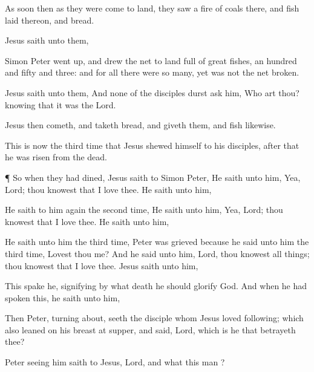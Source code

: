 {As
soon
then as they were
come
to
land, they
saw a fire of
coals
there,
and
fish laid
thereon,
and
bread.

Jesus
saith unto
them,
{}

Simon
Peter went
up,
and
drew the
net
to
land
full of
great
fishes, an
hundred and fifty and
three:
and for all there
were so
many, yet
was
not the
net
broken.

Jesus
saith unto
them,
{}
And
none of the
disciples
durst
ask
him,
Who
art
thou?
knowing
that it
was the
Lord.

Jesus
then
cometh,
and
taketh
bread,
and
giveth
them,
and
fish
likewise.

This is
now the third
time that
Jesus shewed
himself to
his
disciples, after that he was
risen
from the
dead.


\par }{\PP {}¶
So
when they had
dined,
Jesus
saith to
Simon
Peter,
{} He
saith unto
him,
Yea,
Lord;
thou
knowest
that I
love
thee. He
saith unto
him,
{}

He
saith to
him
again the second
time,
{} He
saith unto
him,
Yea,
Lord;
thou
knowest
that I
love
thee. He
saith unto
him,
{}

He
saith unto
him the third
time,
{}
Peter was
grieved
because he
said unto
him the third
time, Lovest
thou
me?
And he
said unto
him,
Lord,
thou
knowest all
things;
thou
knowest
that I
love
thee.
Jesus
saith unto
him,
{}


This spake
he,
signifying by
what
death he should
glorify
God.
And when he had
spoken
this, he
saith unto
him,
{}

Then
Peter, turning
about,
seeth the
disciple
whom
Jesus
loved
following;
which
also
leaned
on
his
breast
at
supper,
and
said,
Lord,
which
is he
that
betrayeth
thee?

Peter
seeing
him
saith to
Jesus,
Lord,
and
what
{} this
man
{}?

}
